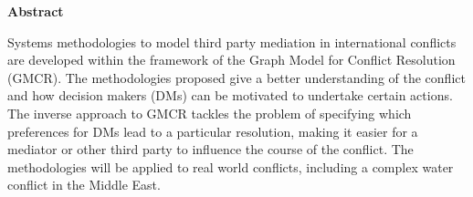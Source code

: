 \documentclass[letterpaper,12pt,titlepage,oneside,final]{book}
\let\origdoublepage\cleardoublepage
\newcommand{\clearemptydoublepage}{%
  \clearpage{\pagestyle{empty}\origdoublepage}}
\let\cleardoublepage\clearemptydoublepage
\begin{document}
\cleardoublepage %
 



  


\begin{center}\textbf{Abstract}\end{center}

Systems methodologies to model third party mediation in international conflicts are developed within the framework of the Graph Model for Conflict Resolution (GMCR). The methodologies proposed give a better understanding of the conflict and how decision makers (DMs) can be motivated to undertake certain actions. The inverse approach to GMCR tackles the problem of specifying which preferences  for DMs lead to a particular resolution, making it easier for a mediator or other third party to influence the course of the conflict. The methodologies will be applied to real world conflicts, including a complex water conflict in the Middle East.

\cleardoublepage





\end{document}
